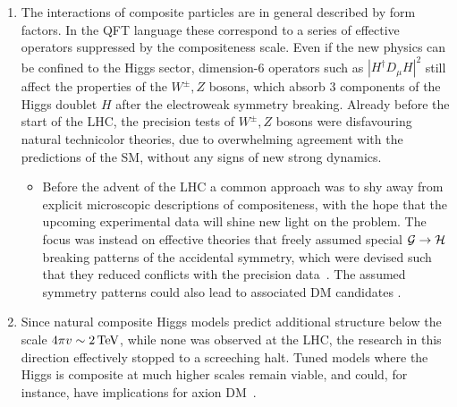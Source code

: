 \begin{enumerate}
\begin{itemize}
\item[$\circ$] The second possibility is to add elementary techni-colored scalars with their own Yukawa couplings~\cite{CompositeHiggsDM}. 
Such models can accidentally conserve techni-baryon number, such that the lightest techni-baryon can be stable (similarly to the proton).
If neutral, they  can be a composite DM candidate, with specific couplings to the composite Higgs.
\end{itemize} 


\item The interactions of composite particles are in general described by form factors. In the 
QFT language these correspond to a series of effective operators suppressed by the compositeness scale.
Even if the new physics can be confined to the Higgs sector, dimension-6 operators such as $|H^\dagger D_\mu H|^2$
still affect the properties of the $W^\pm,Z$ bosons, which absorb 3 components of the Higgs doublet $H$ after the electroweak symmetry breaking.
Already before the start of the LHC, the precision tests of $W^\pm,Z$ bosons were disfavouring natural technicolor theories, due to overwhelming agreement with the predictions of the SM, without any signs of new strong dynamics.
\begin{itemize}
\item[$\circ$] 
Before the advent of the LHC a common approach was to shy away from explicit microscopic descriptions of compositeness, with the hope that the upcoming experimental data will shine new light on the problem. The focus was instead on effective theories that freely assumed special  $\cal{G}\to \cal{H}$ breaking patterns of the accidental symmetry, which were 
devised such that they reduced conflicts with the precision data~\cite{coset}. 
The assumed symmetry patterns could also lead to associated DM candidates \cite{DM:composite:Higgs}. 
\end{itemize}
\item Since natural composite Higgs models predict additional structure below the scale $4\pi v\sim 2\,{\rm TeV}$, 
while none was observed at the LHC, the research in this direction effectively stopped to a screeching halt.
Tuned models where the Higgs is composite at much higher scales remain viable,  and could, for instance, have implications for axion DM~\cite{1208.6013}.

\end{enumerate}



